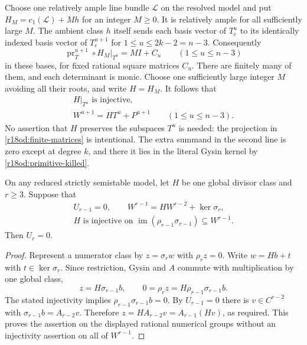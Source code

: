 Choose one relatively ample line bundle $\mathcal L$ on the
resolved model and put
$H_M=c_1(\mathcal L)+Mh$ for an integer $M\ge0$.
It is relatively ample for all sufficiently large $M$.
The ambient class $h$ itself sends each basis vector of $T_e^u$
to its identically indexed basis vector of $T_e^{u+1}$ for
$1\le u\le 2k-2=n-3$.  Consequently
\[
 \operatorname{pr}_T^{u+1}\circ H_M|_{T^u}
                              =MI+C_u
 \qquad(1\le u\le n-3)
 \tag{OD18.11}\label{r18od:finite-matrices}
\]
in these bases, for fixed rational square matrices $C_u$.
There are finitely many of them, and each determinant is monic.
Choose one sufficiently large integer $M$ avoiding all their
roots, and write $H=H_M$.  It follows that
\[
 \begin{gathered}
 H|_{T^u}\text{ is injective},\\
 W^{u+1}=H T^u+P^{u+1}
                       \qquad(1\le u\le n-3).
 \end{gathered}
 \tag{OD18.12}\label{r18od:ample-consequences}
\]
No assertion that $H$ preserves the subspaces $T^u$ is needed:
the projection in \eqref{r18od:finite-matrices} is intentional.
The extra summand in the second line is zero except at degree
$k$, and there it lies in the literal Gysin kernel by
\eqref{r18od:primitive-killed}.

\begin{lemma}
\label{r18od:weaker-DG}
On any reduced strictly semistable model, let $H$ be one global
divisor class and $r\ge3$.  Suppose that
\[
 \begin{gathered}
 U_{r-1}=0,\qquad
 W^{r-1}=H W^{r-2}+\ker\sigma_r,\\
 H\text{ is injective on }
              \operatorname{im}(\rho_{r-1}\sigma_{r-1})
                      \subseteq W^{r-1}.
 \end{gathered}
 \tag{OD18.13}\label{r18od:weak-hypotheses}
\]
Then $U_r=0$.
\end{lemma}

\begin{proof}
Represent a numerator class by $z=\sigma_rw$ with $\rho_rz=0$.
Write $w=Hb+t$ with $t\in\ker\sigma_r$.  Since restriction,
Gysin and $A$ commute with multiplication by one global class,
\[
          z=H\sigma_{r-1}b,
        \qquad 0=\rho_rz=H\rho_{r-1}\sigma_{r-1}b.
\]
The stated injectivity implies
$\rho_{r-1}\sigma_{r-1}b=0$.
By $U_{r-1}=0$ there is $v\in C^{r-2}$ with
$\sigma_{r-1}b=A_{r-2}v$.  Therefore
$z=HA_{r-2}v=A_{r-1}(Hv)$, as required.
This proves the assertion on the displayed rational numerical
groups without an injectivity assertion on all of $W^{r-1}$.
\end{proof}

